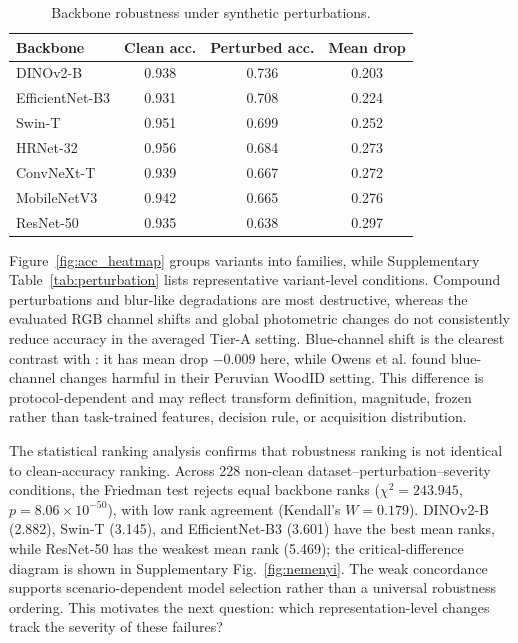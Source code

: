 \documentclass[a4paper,fleqn]{els-cas-templates/cas-sc}
\begin{document}
\begin{table}[pos=htbp]
\centering
\caption{Backbone robustness under synthetic perturbations.}
\label{tab:robustness}
\begin{tabular}{lccc}
\toprule
Backbone & Clean acc. & Perturbed acc. & Mean drop \\
\midrule
DINOv2-B & 0.938 & 0.736 & 0.203 \\
EfficientNet-B3 & 0.931 & 0.708 & 0.224 \\
Swin-T & 0.951 & 0.699 & 0.252 \\
HRNet-32 & 0.956 & 0.684 & 0.273 \\
ConvNeXt-T & 0.939 & 0.667 & 0.272 \\
MobileNetV3 & 0.942 & 0.665 & 0.276 \\
ResNet-50 & 0.935 & 0.638 & 0.297 \\
\bottomrule
\end{tabular}
\end{table}

Figure~\ref{fig:acc_heatmap} groups variants into families, while
Supplementary Table~\ref{tab:perturbation} lists representative variant-level
conditions. Compound perturbations and blur-like degradations are most
destructive, whereas the evaluated RGB channel shifts and global photometric
changes do not consistently reduce accuracy in the averaged Tier-A setting.
Blue-channel shift is the clearest contrast with \citet{owens2025robustness}:
it has mean drop $-0.009$ here, while Owens et al. found blue-channel changes
harmful in their Peruvian WoodID setting. This difference is protocol-dependent
and may reflect transform definition, magnitude, frozen rather than task-trained
features, decision rule, or acquisition distribution.

The statistical ranking analysis confirms that robustness ranking is not
identical to clean-accuracy ranking. Across 228 non-clean
dataset--perturbation--severity conditions, the Friedman test rejects equal
backbone ranks ($\chi^2=243.945$, $p=8.06\times 10^{-50}$), with low rank
agreement (Kendall's $W=0.179$). DINOv2-B (2.882), Swin-T (3.145), and
EfficientNet-B3 (3.601) have the best mean ranks, while ResNet-50 has the
weakest mean rank (5.469); the critical-difference diagram is shown in
Supplementary Fig.~\ref{fig:nemenyi}. The weak concordance supports
scenario-dependent model selection rather than a universal robustness ordering.
This motivates the next question: which representation-level changes track the
severity of these failures?
\end{document}
